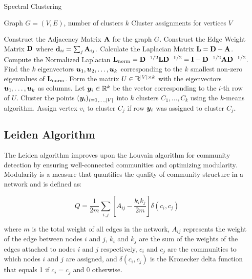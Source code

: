 \begin{algorithm}[H]
\caption{Spectral Clustering}
\label{alg:spectral_clustering}
\begin{algorithmic}[1]
\Require Graph $G = (V, E)$, number of clusters $k$
\Ensure Cluster assignments for vertices $V$

\State Construct the Adjacency Matrix $\mathbf{A}$ for the graph $G$.
\State Construct the Edge Weight Matrix $\mathbf{D}$ where $\mathbf{d}_{ii} = \sum_j \mathbf{A}_{ij}$.
\State Calculate the Laplacian Matrix $\mathbf{L} = \mathbf{D} - \mathbf{A}$.
\State Compute the Normalized Laplacian $\mathbf{L}_{\text{norm}} = \mathbf{D}^{-1/2} \mathbf{L} \mathbf{D}^{-1/2} = \mathbf{I} - \mathbf{D}^{-1/2} \mathbf{A} \mathbf{D}^{-1/2}$.
\State Find the $k$ eigenvectors $\boldsymbol{u}_1, \boldsymbol{u}_2, \dots, \boldsymbol{u}_k$ corresponding to the $k$ smallest non-zero eigenvalues of $\mathbf{L}_{\text{norm}}$.
\State Form the matrix $U \in \mathbb{R}^{|V| \times k}$ with the eigenvectors $\boldsymbol{u}_1, \dots, \boldsymbol{u}_k$ as columns.
\State Let $\boldsymbol{y}_i \in \mathbb{R}^k$ be the vector corresponding to the $i$-th row of $U$.
\State Cluster the points $(\boldsymbol{y}_i)_{i=1, \dots, |V|}$ into $k$ clusters $C_1, \dots, C_k$ using the $k$-means algorithm.
\State Assign vertex $v_i$ to cluster $C_j$ if row $\boldsymbol{y}_i$ was assigned to cluster $C_j$.

\end{algorithmic}
\end{algorithm}


\subsection{Leiden Algorithm}
\label{subsec:LeidenAlgorithm}

The Leiden algorithm improves upon the Louvain algorithm for community detection by ensuring well-connected communities and optimizing modularity. Modularity is a measure that quantifies the quality of community structure in a network and is defined as:

\begin{equation}
Q = \frac{1}{2m} \sum_{i,j} \left[ A_{ij} - \frac{k_i k_j}{2m} \right] \delta(c_i, c_j)
\end{equation}

where $m$ is the total weight of all edges in the network, $A_{ij}$ represents the weight of the edge between nodes $i$ and $j$, $k_i$ and $k_j$ are the sum of the weights of the edges attached to nodes $i$ and $j$ respectively, $c_i$ and $c_j$ are the communities to which nodes $i$ and $j$ are assigned, and $\delta(c_i, c_j)$ is the Kronecker delta function that equals 1 if $c_i = c_j$ and 0 otherwise.

